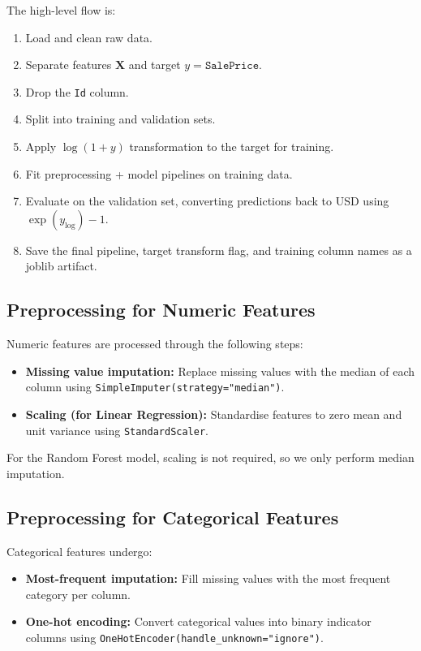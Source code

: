 \documentclass[11pt,a4paper]{article}
\begin{document}
The high-level flow is:

\begin{enumerate}[leftmargin=*]
    \item Load and clean raw data.
    \item Separate features \(\mathbf{X}\) and target \(y = \texttt{SalePrice}\).
    \item Drop the \texttt{Id} column.
    \item Split into training and validation sets.
    \item Apply \(\log(1 + y)\) transformation to the target for training.
    \item Fit preprocessing + model pipelines on training data.
    \item Evaluate on the validation set, converting predictions back to USD using \(\exp(y_{\log}) - 1\).
    \item Save the final pipeline, target transform flag, and training column names as a joblib artifact.
\end{enumerate}

\subsection{Preprocessing for Numeric Features}

Numeric features are processed through the following steps:

\begin{itemize}[leftmargin=*]
    \item \textbf{Missing value imputation:} Replace missing values with the median of each column using \texttt{SimpleImputer(strategy="median")}.
    \item \textbf{Scaling (for Linear Regression):} Standardise features to zero mean and unit variance using \texttt{StandardScaler}.
\end{itemize}

For the Random Forest model, scaling is not required, so we only perform median imputation.

\subsection{Preprocessing for Categorical Features}

Categorical features undergo:

\begin{itemize}[leftmargin=*]
    \item \textbf{Most-frequent imputation:} Fill missing values with the most frequent category per column.
    \item \textbf{One-hot encoding:} Convert categorical values into binary indicator columns using \texttt{OneHotEncoder(handle\_unknown="ignore")}.
\end{itemize}
\end{document}

